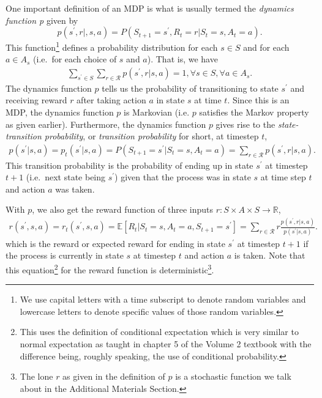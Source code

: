 One important definition of an MDP is what is usually termed the \emph{dynamics function p} given by
\begin{equation}
    p(s^\prime,r|,s,a) = P(S_{t+1} = s^\prime, R_t = r|S_t = s, A_t = a) \label{eq:MDP_dynamics_p}.
\end{equation}
This function\footnote{We use capital letters with a time subscript to denote random variables and lowercase letters to denote specific values of those random variables.} defines a probability distribution for each $s\in S$ and for each $a\in A_s$ (i.e.\ for each choice of $s$ and $a$).
That is, we have
\begin{align}
    \sum_{s^\prime\in S}\sum_{r\in\mathcal{R}}p(s^\prime,r|s,a) = 1, \forall s\in S,\forall a\in A_s.
    \label{eq:MDP_dynamics_p_sum}
\end{align}
The dynamics function $p$ tells us the probability of transitioning to state $s^\prime$ and receiving reward $r$ after taking action $a$ in state $s$ at time $t$.
Since this is an MDP, the dynamics function $p$ is Markovian (i.e. $p$ satisfies the Markov property as given earlier).
Furthermore, the dynamics function $p$ gives rise to the \emph{state-transition probability}, or \emph{transition probability} for short, at timestep $t$,
\begin{align}
    p(s^\prime|s,a) = p_t(s^\prime|s,a) = P(S_{t+1}=s^\prime|S_t=s, A_t=a) = \sum_{r\in\mathcal{R}}p(s^\prime, r|s,a).
    \label{eq:MDP_transition_prob}
\end{align}
This transition probability is the probability of ending up in state $s^\prime$ at timestep $t+1$ (i.e.\ next state being $s^\prime$) given that the process was in state $s$ at time step $t$ and action $a$ was taken.

With $p$, we also get the reward function of three inputs $r:S\times A\times S\to\mathbb{R}$,
\begin{align}
    r(s^\prime, s,a)=r_t(s^\prime,s,a) = \mathbb{E}[R_{t}|S_t=s, A_t=a, S_{t+1}=s^\prime] = \sum_{r\in\mathcal{R}}r \frac{p(s^\prime, r|s,a)}{p(s^\prime|s,a)}.
    \label{eq:MDP_reward_three_inputs}
\end{align}
which is the reward or expected reward for ending in state $s^\prime$ at timestep $t+1$ if the process is currently in state $s$ at timestep $t$ and action $a$ is taken.
Note that this equation\footnote{This uses the definition of conditional expectation which is very similar to normal expectation as taught in chapter 5 of the Volume 2 textbook with the difference being, roughly speaking, the use of conditional probability.} for the reward function is deterministic\footnote{The lone $r$ as given in the definition of $p$ is a stochastic function we talk about in the Additional Materials Section.}.

